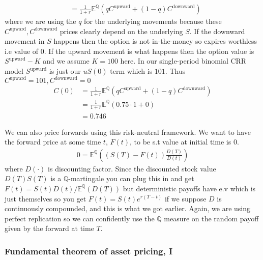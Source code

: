 \documentclass[9pt]{extarticle}
\begin{document}
\begin{enumerate}
\begin{align*}
         &= \frac{1}{1+r}\mathbb{E}^{\mathbb{Q}}(qC^{\text{upward}} + (1-q)C^{\text{downward}})
  \end{align*}
  where we are using the $q$ for the underlying movements because 
  these $C^{\text{upward}}, C^{\text{downward}}$ prices clearly depend on the underlying $S$. 
  If the downward movement in $S$ happens then the option is not in-the-money so expires worthless i.e 
  value of $0$. If the upward movement is what happens then the option value is $S^{\text{upward}}-K$
  and we assume $K=100$ here. In our single-period binomial CRR model $S^{\text{upward}}$ is just 
  our $uS(0)$ term which is $101$. Thus $C^{\text{upward}}=101, C^{\text{downward}} =0$
  \begin{align*}
    C(0)&= \frac{1}{1+r}\mathbb{E}^{\mathbb{Q}}(qC^{\text{upward}} + (1-q)C^{\text{downward}}) \\
        &= \frac{1}{1+r}\mathbb{E}^{\mathbb{Q}}(0.75\cdot 1 + 0)\\ 
        &= 0.746 
  \end{align*}
\end{enumerate}

We can also price forwards using this risk-neutral framework. We want to have the 
forward price at some time $t$, $F(t)$, to be s.t value at initial time is 0.
\begin{align}
  0 = \mathbb{E}^{\mathbb{Q}}((S(T)-F(t))\frac{D(T)}{D(t)})
\end{align}
where $D(\cdot)$ is discounting factor. Since the discounted stock value $D(T)S(T)$ is a 
$\mathbb{Q}$-martingale you can plug this in and get $F(t)=S(t)D(t)/\mathbb{E}^{\mathbb{Q}}(D(T))$
but deterministic payoffs have e.v which is just themselves so you get $F(t) = S(t)e^{r(T-t)}$ 
if we suppose $D$ is continuously compounded, and this is what we got earlier. Again, we are using perfect 
replication so we can confidently use the $\mathbb{Q}$ measure on the random payoff given by the forward at time $T$.

\subsubsection{Fundamental theorem of asset pricing, I}
\end{document}
